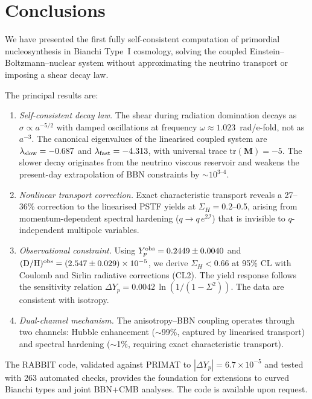 \documentclass[a4paper,11pt]{article}
\newcommand{\Sig}{\Sigma}
\newcommand{\SigH}{\Sigma_H}
\newcommand{\Yp}{Y_p}
\begin{document}
\section{Conclusions}\label{sec:conclusions}

We have presented the first fully self-consistent computation of primordial nucleosynthesis in Bianchi Type~I cosmology, solving the coupled Einstein--Boltzmann--nuclear system without approximating the neutrino transport or imposing a shear decay law.

The principal results are:

\begin{enumerate}
\item \textit{Self-consistent decay law.}  The shear during radiation domination decays as $\sigma \propto a^{-5/2}$ with damped oscillations at frequency $\omega \approx 1.023$~rad/e-fold, not as $a^{-3}$.  The canonical eigenvalues of the linearised coupled system are $\lambda_{\rm slow} = -0.687$ and $\lambda_{\rm fast} = -4.313$, with universal trace $\mathrm{tr}(\mathbf{M}) = -5$.  The slower decay originates from the neutrino viscous reservoir and weakens the present-day extrapolation of BBN constraints by $\sim 10^{3\text{--}4}$.

\item \textit{Nonlinear transport correction.}  Exact characteristic transport reveals a 27--36\% correction to the linearised PSTF yields at $\SigH = 0.2$--0.5, arising from momentum-dependent spectral hardening ($q \to q\,e^{2\mathcal{I}}$) that is invisible to $q$-independent multipole variables.

\item \textit{Observational constraint.}  Using $\Yp^{\rm obs} = 0.2449 \pm 0.0040$ and $(\mathrm{D/H})^{\rm obs} = (2.547 \pm 0.029)\times 10^{-5}$, we derive $\SigH < 0.66$ at 95\% CL with Coulomb and Sirlin radiative corrections (CL2).  The yield response follows the sensitivity relation $\Delta\Yp = 0.0042\,\ln(1/(1-\Sig^2))$.  The data are consistent with isotropy.

\item \textit{Dual-channel mechanism.}  The anisotropy--BBN coupling operates through two channels: Hubble enhancement ($\sim$99\%, captured by linearised transport) and spectral hardening ($\sim$1\%, requiring exact characteristic transport).
\end{enumerate}

The RABBIT code, validated against PRIMAT to $|\Delta\Yp| = 6.7\times 10^{-5}$ and tested with 263 automated checks, provides the foundation for extensions to curved Bianchi types and joint BBN+CMB analyses.  The code is available upon request.
\end{document}
